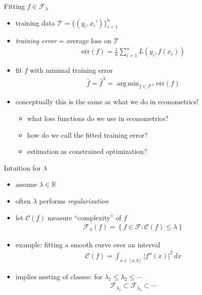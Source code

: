 \documentclass[xcolor=dvipsnames, handout]{beamer}
\DeclareMathOperator{\argmin}{arg\,min}
\begin{document}
\begin{frame}{Fitting $f \in \mathcal{F}_{\lambda}$}
\begin{itemize}
  \item training data $\mathcal{T} = \{ (y_i, x_i') \}_{i=1}^n$
  \item \emph{training error} = average loss on $\mathcal{T}$
  \begin{align*}
     \overline{\text{err}} (f) = \frac{1}{n} \sum_{i=1}^n L\left(y_i, f(x_i) \right) 
   \end{align*} 
   \pause
   \item fit $f$ with minimal training error
   \begin{align*}
     \hat{f} = \hat{f}^{\lambda} = \argmin_{f \in \mathcal{F}^{\lambda}} \overline{\text{err}} (f) 
   \end{align*}
   \pause 
   \item conceptually this is the same as what we do in econometrics! 
   \begin{itemize}
     \pause\item what loss functions do we use in econometrics?
     \pause\item how do we call the fitted training error?
     \pause\item estimation as constrained optimization?
   \end{itemize}
\end{itemize}
\end{frame}


\begin{frame}{Intuition for $\lambda$}
\begin{itemize}
  \item assume $\lambda \in \mathbb{R}$
  \item often $\lambda$ performs \emph{regularization}
  \pause
  \item let $\mathcal{C}(f)$ measure ``complexity'' of $f$
  \begin{align*}
    \mathcal{F}_{\lambda}(f) = \left\{f \in \mathcal{F} : \mathcal{C}(f) \leq \lambda \right\}   
  \end{align*} 
  \pause 
  \item example: fitting a smooth curve over an interval
  \begin{align*}
    \mathcal{C}(f) = \int_{x \in [a,b]} \lvert f''(x) \rvert^2 \, dx
  \end{align*}
  \pause 
  \item implies nesting of classes: for $\lambda_1 \leq \lambda_2 \leq \dotsb$
  \begin{align*}
    \mathcal{F}_{\lambda_1}\subset \mathcal{F}_{\lambda_2} \subset \dotsb
  \end{align*}
\end{itemize}
\end{frame}
\end{document}
